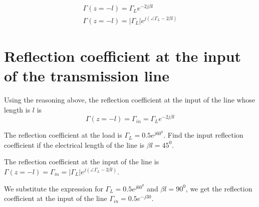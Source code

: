 \documentclass{ximera}
\begin{document}
\begin{eqnarray}
\Gamma(z=-l)=\Gamma_L e^{-2j \beta l} \\
\Gamma(z=-l)=|\Gamma_L| e^{j ( \angle \Gamma_L - 2 \beta l) }
\end{eqnarray}



\section{Reflection coefficient at the input of the transmission line}

Using the reasoning above, the reflection coefficient at the input of the line whose length is $l$ is
\begin{equation}
\Gamma(z=-l)=\Gamma_{in}=\Gamma_L e^{-2j \beta l}
\end{equation}

\begin{example}
The reflection coefficient at the load is $\Gamma_L=0.5 e^{j60^0}$. Find the input reflection coefficient if the electrical length of the line is $\beta l= 45^0$.

\begin{explanation}
The reflection coefficient at the input of the line is $\Gamma(z=-l)=\Gamma_{in}=|\Gamma_L| e^{j ( \angle \Gamma_L - 2 \beta l) }$. 

We substitute the expression for $\Gamma_L=0.5 e^{j60^0}$ and $\beta l= 90^0$, we get the reflection coefficient at the input of the line $\Gamma_{in}=0.5 e^{-j30 }$.

\end{explanation}

\end{example}
\end{document}
